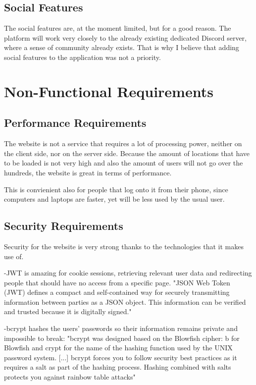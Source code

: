 \documentclass[12pt,a4paper]{report}
\begin{document}
\subsection{Social Features}
The social features are, at the moment limited, but for a good reason. The platform will work very closely to the already existing dedicated Discord server, where a sense of community already exists. That is why I believe that adding social features to the application was not a priority.

\section{Non-Functional Requirements}
\subsection{Performance Requirements}
The website is not a service that requires a lot of processing power, neither on the client side, nor on the server side. Because the amount of locations that have to be loaded is not very high and also the amount of users will not go over the hundreds, the website is great in terms of performance.

This is convienient also for people that log onto it from their phone, since computers and laptops are faster, yet will be less used by the usual user.

\subsection{Security Requirements}
Security for the website is very strong thanks to the technologies that it makes use of.

-JWT is amazing for cookie sessions, retrieving relevant user data and redirecting people that should have no access from a specific page.
"JSON Web Token (JWT) defines a compact and self-contained way for securely transmitting information between parties as a JSON object. This information can be verified and trusted because it is digitally signed."~\cite{JWT}

-bcrypt hashes the users' passwords so their information remains private and impossible to break:
"bcrypt was designed based on the Blowfish cipher: b for Blowfish and crypt for the name of the hashing function used by the UNIX password system. [...] bcrypt forces you to follow security best practices as it requires a salt as part of the hashing process. Hashing combined with salts protects you against rainbow table attacks"~\cite{bcrypt}
\end{document}
